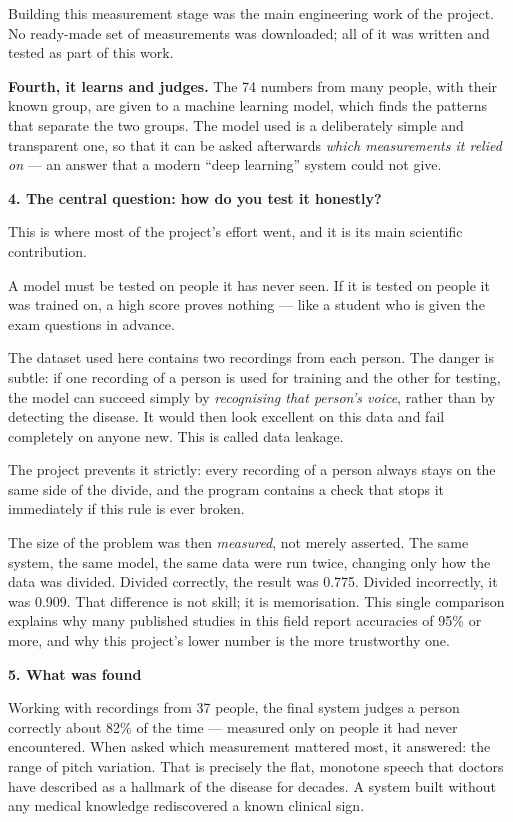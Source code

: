\documentclass[11pt,a4paper]{report}
\newcommand{\sheadEN}[1]{\par\vspace{4pt}%
\noindent{\color{honest}\rule[0.5ex]{16pt}{2.4pt}}\hspace{7pt}%
{\large\bfseries\color{ink}#1}\par\vspace{2pt}}
\newcommand{\stage}[1]{{\color{honest}\textbf{#1}}}
\begin{document}
Building this measurement stage was the main engineering work of the
project. No ready-made set of measurements was downloaded; all of it
was written and tested as part of this work.

\stage{Fourth, it learns and judges.} The 74 numbers from many
people, with their known group, are given to a machine learning model,
which finds the patterns that separate the two groups. The model used
is a deliberately simple and transparent one, so that it can be asked
afterwards \emph{which measurements it relied on} --- an answer that a
modern ``deep learning'' system could not give.

\enlargethispage{1\baselineskip}%
\sheadEN{4. The central question: how do you test it honestly?}
This is where most of the project's effort went, and it is its main
scientific contribution.

A model must be tested on people it has never seen. If it is tested on
people it was trained on, a high score proves nothing --- like a
student who is given the exam questions in advance.

The dataset used here contains two recordings from each person. The
danger is subtle: if one recording of a person is used for training
and the other for testing, the model can succeed simply by
\emph{recognising that person's voice}, rather than by detecting the
disease. It would then look excellent on this data and fail completely
on anyone new. This is called data leakage.

The project prevents it strictly: every recording of a person always
stays on the same side of the divide, and the program contains a check
that stops it immediately if this rule is ever broken.

The size of the problem was then \emph{measured}, not merely asserted.
The same system, the same model, the same data were run twice,
changing only how the data was divided. Divided correctly, the result
was 0.775. Divided incorrectly, it was 0.909. That difference is not
skill; it is memorisation. This single comparison explains why many
published studies in this field report accuracies of 95\% or more, and
why this project's lower number is the more trustworthy one.

\sheadEN{5. What was found}
Working with recordings from 37 people, the final system judges a
person correctly about 82\% of the time --- measured only on people it
had never encountered. When asked which measurement mattered most, it
answered: the range of pitch variation. That is precisely the flat,
monotone speech that doctors have described as a hallmark of the
disease for decades. A system built without any medical knowledge
rediscovered a known clinical sign.
\end{document}
